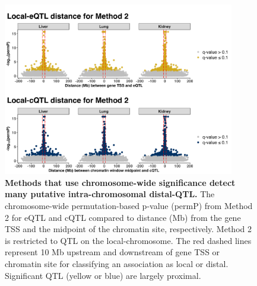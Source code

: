 \documentclass[9pt,twocolumn,twoside]{gsajnl}
\begin{document}
\begin{figure}[hp]
\renewcommand{\familydefault}{\sfdefault}\normalfont
\centering
\includegraphics[width=0.9\textwidth]{figs/qtl_distance_method2.pdf}
\caption{\textbf{Methods that use chromosome-wide significance detect many putative intra-chromosomal distal-QTL.} The chromosome-wide permutation-based p-value (permP) from Method 2 for eQTL and cQTL compared to distance (Mb) from the gene TSS and the midpoint of the chromatin site, respectively. Method 2 is restricted to QTL on the local-chromosome. The red dashed lines represent 10 Mb upstream and downstream of gene TSS or chromatin site for classifying an association as local or distal. Significant QTL (yellow or blue) are largely proximal.
\label{fig:chrwide_dist}}
\end{figure}
\end{document}
